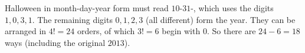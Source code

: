 Halloween in month-day-year form must read $10$-$31$-, which uses the digits $1,0,3,1$. The remaining digits $0,1,2,3$ (all different) form the year. They can be arranged in $4!=24$ orders, of which $3!=6$ begin with $0$. So there are $24-6=\boxed{18}$ ways (including the original $2013$).

